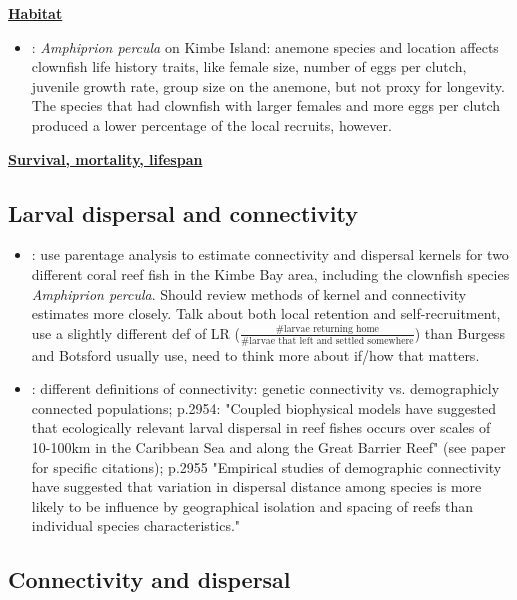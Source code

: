 \documentclass[12pt, oneside]{article}   	%
\begin{document}
\textbf{\underline{Habitat}}
\begin{itemize}
\item \cite{salles2016genetic}: \textit{Amphiprion percula} on Kimbe Island: anemone species and location affects clownfish life history traits, like female size, number of eggs per clutch, juvenile growth rate, group size on the anemone, but not proxy for longevity. The species that had clownfish with larger females and more eggs per clutch produced a lower percentage of the local recruits, however.
\end{itemize}

\textbf{\underline{Survival, mortality, lifespan}}

\subsection*{Larval dispersal and connectivity}
\begin{itemize}
\item \citep{almany2017larval}: use parentage analysis to estimate connectivity and dispersal kernels for two different coral reef fish in the Kimbe Bay area, including the clownfish species \textit{Amphiprion percula}. Should review methods of kernel and connectivity estimates more closely. Talk about both local retention and self-recruitment, use a slightly different def of LR ($\frac{\text{\# larvae returning home}}{\text{\# larvae that left and settled somewhere}}$) than Burgess and Botsford usually use, need to think more about if/how that matters.
\item \citep{saenz2011connectivity}: different definitions of connectivity: genetic connectivity vs. demographicly connected populations; p.2954: "Coupled biophysical models have suggested that ecologically relevant larval dispersal in reef fishes occurs over scales of 10-100km in the Caribbean Sea and along the Great Barrier Reef" (see paper for specific citations); p.2955 "Empirical studies of demographic connectivity have suggested that variation in dispersal distance among species is more likely to be influence by geographical isolation and spacing of reefs than individual species characteristics."
\end{itemize}

\subsection*{Connectivity and dispersal}
\end{document}
